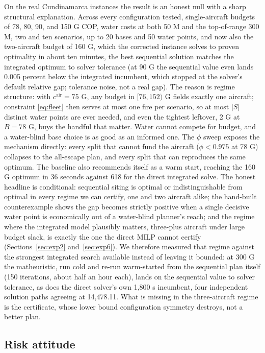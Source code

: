\documentclass[11pt]{article}
\begin{document}
On the real Cundinamarca instances the result is an honest null with a
sharp structural explanation. Across every configuration tested,
single-aircraft budgets of 78, 80, 90, and 150 G COP, water costs at
both 50 M and the top-of-range 300 M, two and ten scenarios, up to 20
bases and 50 water points, and now also the two-aircraft budget of
160 G, which the corrected instance solves to proven optimality in
about ten minutes, the best sequential solution matches the
integrated optimum to solver tolerance (at 90 G the sequential value
even lands 0.005 percent below the integrated incumbent, which
stopped at the solver's default relative gap; tolerance noise, not a
real gap). The reason is regime structure: with $c^{\mathrm{air}} =
75$ G, any budget in $[76, 152)$ G fields exactly one aircraft;
constraint \eqref{eq:fleet} then serves at most one fire per
scenario, so at most $|S|$ distinct water points are ever needed, and
even the tightest leftover, 2 G at $B = 78$ G, buys the handful that
matter. Water cannot compete for budget, and a water-blind base
choice is as good as an informed one. The $\phi$ sweep exposes the
mechanism directly: every split that cannot fund the aircraft
($\phi < 0.975$ at 78 G) collapses to the all-escape plan, and every
split that can reproduces the same optimum. The baseline also
recommends itself as a warm start, reaching the 160 G optimum in 36
seconds against 618 for the direct integrated solve. The honest
headline is conditional: sequential siting is optimal or
indistinguishable from optimal in every regime we can certify, one
and two aircraft alike; the hand-built counterexample shows the gap
becomes strictly positive when a single decisive water point is
economically out of a water-blind planner's reach; and the regime
where the integrated model plausibly matters, three-plus aircraft
under large budget slack, is exactly the one the direct MILP cannot
certify (Sections~\ref{sec:exp2} and~\ref{sec:exp6}). We therefore
measured that regime against the strongest integrated search
available instead of leaving it bounded: at 300 G the matheuristic,
run cold and re-run warm-started from the sequential plan itself
(150 iterations, about half an hour each), lands on the sequential
value to solver tolerance, as does the direct solver's own 1,800 s
incumbent, four independent solution paths agreeing at 14,478.11.
What is missing in the three-aircraft regime is the certificate,
whose lower bound configuration symmetry destroys, not a better
plan.

\subsection{Risk attitude}
\label{sec:exp4}
\end{document}
